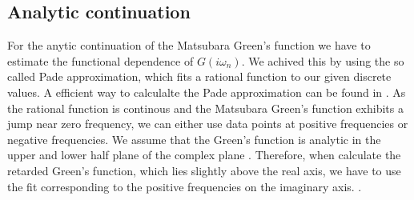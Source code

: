 \begin{appendix}
\section{Analytic continuation}
For the anytic continuation of the Matsubara Green's function we have to estimate the functional dependence of $G(iω_n)$. We achived this by using the so called Pade approximation, which fits a rational function to our given discrete values. A efficient way to calculalte the Pade approximation can be found in . As the rational function is continous and the Matsubara Green's function exhibits a jump near zero frequency, we can either use data points at positive frequencies or negative frequencies. We assume that the Green's function is analytic in the upper and lower half plane of the complex plane . Therefore, when calculate the retarded Green's function, which lies slightly above the real axis, we have to use the fit corresponding to the positive frequencies on the imaginary axis. . 


\end{appendix}
